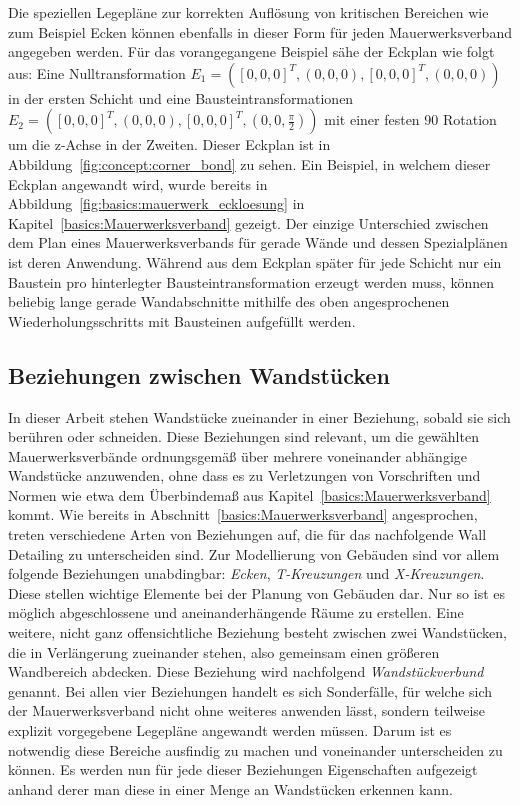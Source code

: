 Die speziellen Legepläne zur korrekten Auflösung von kritischen Bereichen wie zum Beispiel Ecken können ebenfalls in dieser Form für jeden Mauerwerksverband angegeben werden.
Für das vorangegangene Beispiel sähe der Eckplan wie folgt aus:
Eine Nulltransformation \(E_1 = ({[0, 0, 0]}^T, (0, 0, 0), {[0, 0, 0]}^T, (0, 0, 0))\) in der ersten Schicht und eine Bausteintransformationen 
\(E_2 = ({[0, 0, 0]}^T, (0, 0, 0), {[0, 0, 0]}^T, (0, 0, \frac{\pi}{2}))\) mit einer festen 90\degree{} Rotation um die z-Achse in der Zweiten.
Dieser Eckplan ist in Abbildung~\ref{fig:concept:corner_bond} zu sehen.
Ein Beispiel, in welchem dieser Eckplan angewandt wird, wurde bereits in Abbildung~\ref{fig:basics:mauerwerk_eckloesung} in Kapitel~\ref{basics:Mauerwerksverband} gezeigt.
Der einzige Unterschied zwischen dem Plan eines Mauerwerksverbands für gerade Wände und dessen Spezialplänen ist deren Anwendung.
Während aus dem Eckplan später für jede Schicht nur ein Baustein pro hinterlegter Bausteintransformation erzeugt werden muss, können beliebig lange gerade Wandabschnitte mithilfe des oben angesprochenen Wiederholungsschritts mit Bausteinen aufgefüllt werden.

\subsection{Beziehungen zwischen Wandstücken}\label{concept:relations_wandtuecke}
In dieser Arbeit stehen Wandstücke zueinander in einer Beziehung, sobald sie sich berühren oder schneiden.
Diese Beziehungen sind relevant, um die gewählten Mauerwerksverbände ordnungsgemäß über mehrere voneinander abhängige Wandstücke anzuwenden, ohne dass es zu Verletzungen von Vorschriften und Normen wie etwa dem Überbindemaß aus Kapitel~\ref{basics:Mauerwerksverband} kommt.
Wie bereits in Abschnitt~\ref{basics:Mauerwerksverband} angesprochen, treten verschiedene Arten von Beziehungen auf, die für das nachfolgende \glqq{}Wall Detailing\grqq{} zu unterscheiden sind.
Zur Modellierung von Gebäuden sind vor allem folgende Beziehungen unabdingbar:
\textit{Ecken}, \textit{T-Kreuzungen} und \textit{X-Kreuzungen}.
Diese stellen wichtige Elemente bei der Planung von Gebäuden dar. 
Nur so ist es möglich abgeschlossene und aneinanderhängende Räume zu erstellen.
Eine weitere, nicht ganz offensichtliche Beziehung besteht zwischen zwei Wandstücken, die in Verlängerung zueinander stehen, also gemeinsam einen größeren Wandbereich abdecken.
Diese Beziehung wird nachfolgend \textit{Wandstückverbund} genannt.
Bei allen vier Beziehungen handelt es sich Sonderfälle, für welche sich der Mauerwerksverband nicht ohne weiteres anwenden lässt, sondern teilweise explizit vorgegebene Legepläne angewandt werden müssen.
Darum ist es notwendig diese Bereiche ausfindig zu machen und voneinander unterscheiden zu können.
Es werden nun für jede dieser Beziehungen Eigenschaften aufgezeigt anhand derer man diese in einer Menge an Wandstücken erkennen kann.

